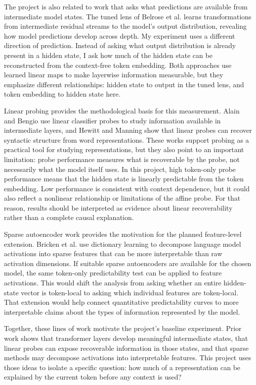 \documentclass[10pt]{article}
\begin{document}
The project is also related to work that asks what predictions are available from intermediate model states. The tuned lens of Belrose et al. \cite{belrose2023tunedlens} learns transformations from intermediate residual streams to the model's output distribution, revealing how model predictions develop across depth. My experiment uses a different direction of prediction. Instead of asking what output distribution is already present in a hidden state, I ask how much of the hidden state can be reconstructed from the context-free token embedding. Both approaches use learned linear maps to make layerwise information measurable, but they emphasize different relationships: hidden state to output in the tuned lens, and token embedding to hidden state here.

Linear probing provides the methodological basis for this measurement. Alain and Bengio \cite{alain2016understanding} use linear classifier probes to study information available in intermediate layers, and Hewitt and Manning \cite{hewitt2019structural} show that linear probes can recover syntactic structure from word representations. These works support probing as a practical tool for studying representations, but they also point to an important limitation: probe performance measures what is recoverable by the probe, not necessarily what the model itself uses. In this project, high token-only probe performance means that the hidden state is linearly predictable from the token embedding. Low performance is consistent with context dependence, but it could also reflect a nonlinear relationship or limitations of the affine probe. For that reason, results should be interpreted as evidence about linear recoverability rather than a complete causal explanation.

Sparse autoencoder work provides the motivation for the planned feature-level extension. Bricken et al. \cite{bricken2023monosemanticity} use dictionary learning to decompose language model activations into sparse features that can be more interpretable than raw activation dimensions. If suitable sparse autoencoders are available for the chosen model, the same token-only predictability test can be applied to feature activations. This would shift the analysis from asking whether an entire hidden-state vector is token-local to asking which individual features are token-local. That extension would help connect quantitative predictability curves to more interpretable claims about the types of information represented by the model.

Together, these lines of work motivate the project's baseline experiment. Prior work shows that transformer layers develop meaningful intermediate states, that linear probes can expose recoverable information in those states, and that sparse methods may decompose activations into interpretable features. This project uses those ideas to isolate a specific question: how much of a representation can be explained by the current token before any context is used?
\end{document}
